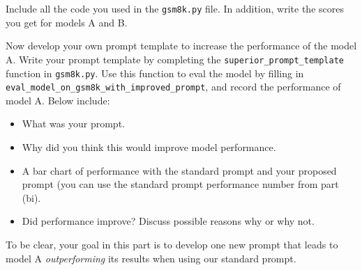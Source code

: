 \begin{parts}
\begin{subparts}
        Include all the code you used in the \texttt{gsm8k.py} file. In addition, write the scores 
        you get for models A and B.

        \subpart[3] Now develop your own prompt template to increase the performance of the model A.
        Write your prompt template by completing the \texttt{superior\_prompt\_template} 
        function in \texttt{gsm8k.py}. Use 
        this function to eval the model by filling in 
        \texttt{eval\_model\_on\_gsm8k\_with\_improved\_prompt}, and record the performance of model A. Below 
        include:

        \begin{itemize}
            \item What was your prompt.
            \item Why did you think this would improve model performance.
            \item A bar chart of performance with the standard prompt and your proposed prompt (you can use the standard 
            prompt performance number from 
            part (bi).
            \item Did performance improve? Discuss possible reasons why or why not.
        \end{itemize}

        To be clear, your goal in this part is to develop 
        one new prompt that leads to model A 
        \emph{outperforming} its results 
        when using our standard prompt.
        

    \end{subparts}

%
    

\end{parts}
